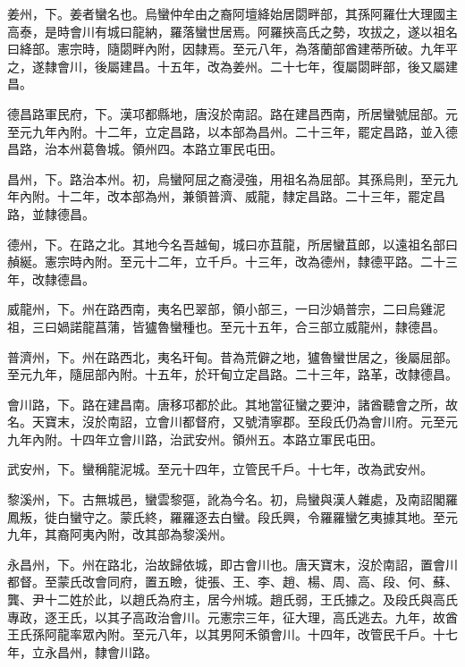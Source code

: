 \begin{pinyinscope}
 姜州，下。姜者蠻名也。烏蠻仲牟由之裔阿壇絳始居閟畔部，其孫阿羅仕大理國主高泰，是時會川有城曰龍納，羅落蠻世居焉。阿羅挾高氏之勢，攻拔之，遂以祖名曰絳部。憲宗時，隨閟畔內附，因隸焉。至元八年，為落蘭部酋建蒂所破。九年平之，遂隸會川，後屬建昌。十五年，改為姜州。二十七年，復屬閟畔部，後又屬建昌。



 德昌路軍民府，下。漢邛都縣地，唐沒於南詔。路在建昌西南，所居蠻號屈部。元至元九年內附。十二年，立定昌路，以本部為昌州。二十三年，罷定昌路，並入德昌路，治本州葛魯城。領州四。本路立軍民屯田。



 昌州，下。路治本州。初，烏蠻阿屈之裔浸強，用祖名為屈部。其孫烏則，至元九年內附。十二年，改本部為州，兼領普濟、威龍，隸定昌路。二十三年，罷定昌路，並隸德昌。



 德州，下。在路之北。其地今名吾越甸，城曰亦苴龍，所居蠻苴郎，以遠祖名部曰赬綖。憲宗時內附。至元十二年，立千戶。十三年，改為德州，隸德平路。二十三年，改隸德昌。



 威龍州，下。州在路西南，夷名巴翠部，領小部三，一曰沙媧普宗，二曰烏雞泥祖，三曰媧諾龍菖蒲，皆獹魯蠻種也。至元十五年，合三部立威龍州，隸德昌。



 普濟州，下。州在路西北，夷名玕甸。昔為荒僻之地，獹魯蠻世居之，後屬屈部。至元九年，隨屈部內附。十五年，於玕甸立定昌路。二十三年，路革，改隸德昌。



 會川路，下。路在建昌南。唐移邛都於此。其地當征蠻之要沖，諸酋聽會之所，故名。天寶末，沒於南詔，立會川都督府，又號清寧郡。至段氏仍為會川府。元至元九年內附。十四年立會川路，治武安州。領州五。本路立軍民屯田。



 武安州，下。蠻稱龍泥城。至元十四年，立管民千戶。十七年，改為武安州。



 黎溪州，下。古無城邑，蠻雲黎彄，訛為今名。初，烏蠻與漢人雜處，及南詔閣羅鳳叛，徙白蠻守之。蒙氏終，羅羅逐去白蠻。段氏興，令羅羅蠻乞夷據其地。至元九年，其裔阿夷內附，改其部為黎溪州。



 永昌州，下。州在路北，治故歸依城，即古會川也。唐天寶末，沒於南詔，置會川都督。至蒙氏改會同府，置五瞼，徙張、王、李、趙、楊、周、高、段、何、蘇、龔、尹十二姓於此，以趙氏為府主，居今州城。趙氏弱，王氏據之。及段氏與高氏專政，逐王氏，以其子高政治會川。元憲宗三年，征大理，高氏逃去。九年，故酋王氏孫阿龍率眾內附。至元八年，以其男阿禾領會川。十四年，改管民千戶。十七年，立永昌州，隸會川路。




\end{pinyinscope}
